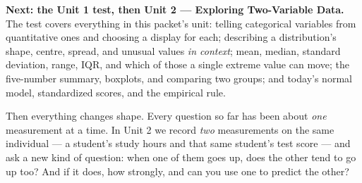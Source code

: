 \boxguard[12]
\begin{spiralbox}
\small
\textbf{Next: the Unit 1 test, then Unit 2 --- Exploring Two-Variable Data.} The test covers
everything in this packet's unit: telling categorical variables from quantitative ones and
choosing a display for each; describing a distribution's shape, centre, spread, and unusual
values \emph{in context}; mean, median, standard deviation, range, IQR, and which of those a
single extreme value can move; the five-number summary, boxplots, and comparing two groups; and
today's normal model, standardized scores, and the empirical rule.

\vspace{3pt}
Then everything changes shape. Every question so far has been about \emph{one} measurement at a
time. In Unit 2 we record \emph{two} measurements on the same individual --- a student's study
hours and that same student's test score --- and ask a new kind of question: when one of them
goes up, does the other tend to go up too? And if it does, how strongly, and can you use one to
predict the other?
\end{spiralbox}


